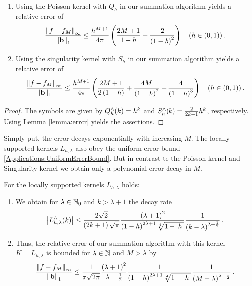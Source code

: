 \begin{lemma}${}^{}$\\[-3.5ex]
 \begin{enumerate}
   \item 
Using the Poisson kernel with $Q_h$ in our summation algorithm yields a relative 
error of
     \begin{equation}
       \label{error:poisson}
       \frac{\left\|f - f_{M}\right\|_{\infty}}{\left\|\mathbf{b}\right\|_1} \le
       \frac{h^{M+1}}{4\pi}
       \left(\frac{2M+1}{1-h}+\frac{2}{\left(1-h\right)^2}\right)\quad \left(h \in (0,1)\right).
     \end{equation}
     \item 
Using the singularity kernel with $S_h$ in our summation algorithm yields 
a relative error of
       \begin{equation}
         \label{error:singular}
         \frac{\left\|f - f_{M}\right\|_{\infty}}{\left\|\mathbf{b}\right\|_1} \le
         \frac{h^{M+1}}{4\pi} \left(\frac{2M+1}{2\left(1-h\right)}+
           \frac{4M}{\left(1-h\right)^2}+
         \frac{4}{\left(1-h\right)^3}\right)\quad \left(h \in (0,1)\right).
       \end{equation}
 \end{enumerate}
\end{lemma}
\begin{proof}
The symbols are given by $Q_{h}^{\wedge}{\hspace{-0.4ex}}\left(k\right)=h^k$ and
$S_{h}^{\wedge}{\hspace{-0.4ex}}\left(k\right)=\frac{2}{2k+1}h^k$, respectively.
Using Lemma \ref{lemma:error} yields the assertions.
\end{proof}
Simply put, the error decays exponentially with increasing $M$.
The locally supported kernels $L_{h,\lambda}$ also obey the uniform error bound
\eqref{Applications:UniformErrorBound}. But in contrast to the Poisson kernel 
and Singularity kernel we obtain only a polynomial error decay in $M$.
\begin{lemma}
  For the locally supported kernels $L_{h,\lambda}$ holds:
  \begin{enumerate}
  \item We obtain for $\lambda \in \mathbb{N}_{0}$ and $k>\lambda+1$ the decay rate
    \[
    \left|L_{h,\lambda}^{\wedge}{\hspace{-0.4ex}}\left(k\right)\right| \le
    \frac{2\sqrt{2}}{\left(2k+1\right)\sqrt{\pi}}
    \frac{\left(\lambda+1\right)^2}{\left(1-h\right)^{2\lambda+1}\sqrt[4]{1-|h|}}
    \frac{1}{\left(k-\lambda\right)^{\lambda+\frac{1}{2}}}\,. 
    \]
  \item Thus, the relative error of our summation algorithm with this kernel
  $K=L_{h,\lambda}$ is bounded for $\lambda \in \mathbb{N}$ and $M>\lambda$ by
  \begin{equation}
    \label{error:Lh}
    \frac{\left\|f - f_{M}\right\|_{\infty}}{\left\|\mathbf{b}\right\|_1} \le
    \frac{1}{\pi\sqrt{2\pi}}
    \frac{\left(\lambda+1\right)^2}{\lambda-\frac{1}{2}}
    \frac{1}{\left(1-h\right)^{2\lambda+1}\sqrt[4]{1-|h|}}
    \frac{1}{\left(M-\lambda\right)^{\lambda-\frac{1}{2}}}\,.
  \end{equation}
  \end{enumerate}
\end{lemma}

